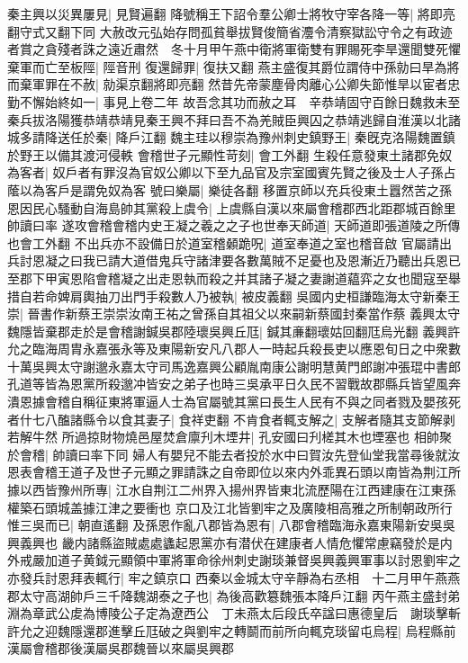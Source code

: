 秦主興以災異屢見|{
	見賢遍翻}
降號稱王下詔令羣公卿士將牧守宰各降一等|{
	將即亮翻守式又翻下同}
大赦改元弘始存問孤貧舉拔賢俊簡省灋令清察獄訟守令之有政迹者賞之貪殘者誅之遠近肅然　冬十月甲午燕中衛將軍衛雙有罪賜死李旱還聞雙死懼棄軍而亡至板陘|{
	陘音刑}
復還歸罪|{
	復扶又翻}
燕主盛復其爵位謂侍中孫勍曰旱為將而棄軍罪在不赦|{
	勍渠京翻將即亮翻}
然昔先帝蒙塵骨肉離心公卿失節惟旱以宦者忠勤不懈始終如一|{
	事見上卷二年}
故吾念其功而赦之耳　辛恭靖固守百餘日魏救未至秦兵拔洛陽獲恭靖恭靖見秦王興不拜曰吾不為羌賊臣興囚之恭靖逃歸自淮漢以北諸城多請降送任於秦|{
	降戶江翻}
魏主珪以穆崇為豫州刺史鎮野王|{
	秦旣克洛陽魏置鎮於野王以備其渡河侵軼}
會稽世子元顯性苛刻|{
	會工外翻}
生殺任意發東土諸郡免奴為客者|{
	奴戶者有罪沒為官奴公卿以下至九品官及宗室國賓先賢之後及士人子孫占䕃以為客戶是謂免奴為客}
號曰樂屬|{
	樂徒各翻}
移置京師以充兵役東土囂然苦之孫恩因民心騷動自海島帥其黨殺上虞令|{
	上虞縣自漢以來屬會稽郡西北距郡城百餘里帥讀曰率}
遂攻會稽會稽内史王凝之羲之之子也世奉天師道|{
	天師道即張道陵之所傳也會工外翻}
不出兵亦不設備日於道室稽顙跪呪|{
	道室奉道之室也稽音啟}
官屬請出兵討恩凝之曰我已請大道借鬼兵守諸津要各數萬賊不足憂也及恩漸近乃聽出兵恩已至郡下甲寅恩陷會稽凝之出走恩執而殺之并其諸子凝之妻謝道藴弈之女也聞寇至舉措自若命婢肩輿抽刀出門手殺數人乃被執|{
	被皮義翻}
吳國内史桓謙臨海太守新秦王崇|{
	晉書作新蔡王崇崇汝南王祐之曾孫自其祖父以來嗣新蔡國封秦當作蔡}
義興太守魏隱皆棄郡走於是會稽謝鍼吳郡陸瓌吳興丘尫|{
	鍼其亷翻瓌姑回翻尫烏光翻}
義興許允之臨海周胄永嘉張永等及東陽新安凡八郡人一時起兵殺長吏以應恩旬日之中衆數十萬吳興太守謝邈永嘉太守司馬逸嘉興公顧胤南康公謝明慧黄門郎謝冲張琨中書郎孔道等皆為恩黨所殺邈冲皆安之弟子也時三吳承平日久民不習戰故郡縣兵皆望風奔潰恩據會稽自稱征東將軍逼人士為官屬號其黨曰長生人民有不與之同者戮及嬰孩死者什七八醢諸縣令以食其妻子|{
	食祥吏翻}
不肯食者輒支解之|{
	支解者隨其支節解剥若解牛然}
所過掠財物燒邑屋焚倉廪刋木堙井|{
	孔安國曰刋槎其木也堙塞也}
相帥聚於會稽|{
	帥讀曰率下同}
婦人有嬰兒不能去者投於水中曰賀汝先登仙堂我當尋後就汝恩表會稽王道子及世子元顯之罪請誅之自帝即位以來内外乖異石頭以南皆為荆江所據以西皆豫州所專|{
	江水自荆江二州界入揚州界皆東北流歷陽在江西建康在江東孫權築石頭城盖據江津之要衝也}
京口及江北皆劉牢之及廣陵相高雅之所制朝政所行惟三吳而已|{
	朝直遙翻}
及孫恩作亂八郡皆為恩有|{
	八郡會稽臨海永嘉東陽新安吳吳興義興也}
畿内諸縣盜賊處處蠭起恩黨亦有潜伏在建康者人情危懼常慮竊發於是内外戒嚴加道子黄鉞元顯領中軍將軍命徐州刺史謝琰兼督吳興義興軍事以討恩劉牢之亦發兵討恩拜表輒行|{
	牢之鎮京口}
西秦以金城太守辛靜為右丞相　十二月甲午燕燕郡太守高湖帥戶三千降魏湖泰之子也|{
	為後高歡簒魏張本降戶江翻}
丙午燕主盛封弟淵為章武公䖍為博陵公子定為遼西公　丁未燕太后段氏卒諡曰惠德皇后　謝琰擊斬許允之迎魏隱還郡進擊丘尫破之與劉牢之轉鬬而前所向輒克琰留屯烏程|{
	烏程縣前漢屬會稽郡後漢屬吳郡魏晉以來屬吳興郡}

